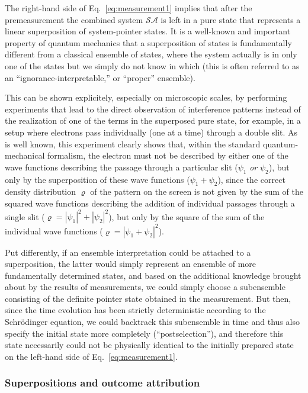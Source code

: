 \documentclass[rmp,aps,amsmath,amsfonts,noshowkeys,noshowpacs,12pt]{revtex4}
\begin{document}
The right-hand side of Eq.~\eqref{eq:measurement1} implies that after
the premeasurement the combined system $\mathcal{SA}$ is left in a
pure state that represents a linear superposition of system-pointer
states. It is a well-known and important property of quantum mechanics
that a superposition of states is fundamentally different from a
classical ensemble of states, where the system actually is in only one
of the states but we simply do not know in which (this is often
referred to as an ``ignorance-interpretable,'' or ``proper''
ensemble).

This can be shown explicitely, especially on microscopic scales, by
performing experiments that lead to the direct observation of
interference patterns instead of the realization of one of the terms
in the superposed pure state, for example, in a setup where electrons
pass individually (one at a time) through a double slit. As is
well known, this experiment clearly shows that, within the standard
quantum-mechanical formalism, the electron must not be described by
either one of the wave functions describing the passage through
a particular slit ($\psi_1$ \emph{or} $\psi_2$), but only by the
superposition of these wave functions ($\psi_1+\psi_2$), since the
correct density distribution $\varrho$ of the pattern on the screen is
not given by the sum of the squared wave functions describing the
addition of individual passages through a single slit ($\varrho =
|\psi_1|^2 + |\psi_2|^2$), but only by the square of the sum of the
individual wave functions ($\varrho = |\psi_1 + \psi_2|^2$).

Put differently, if an ensemble interpretation could be attached to a
superposition, the latter would simply represent an ensemble of more
fundamentally determined states, and based on the additional knowledge
brought about by the results of measurements, we could simply choose a
subensemble consisting of the definite pointer state obtained in the
measurement. But then, since the time evolution has been strictly
deterministic according to the Schr\"odinger equation, we could
backtrack this subensemble in time and thus also specify the
initial state more completely (``postselection''), and
therefore this state necessarily could not be physically identical to
the initially prepared state on the left-hand side of
Eq.~\eqref{eq:measurement1}.


\subsubsection{Superpositions and outcome attribution}
\end{document}
